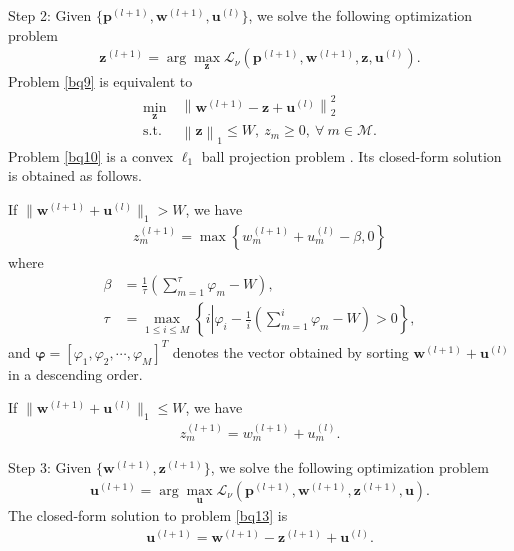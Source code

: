 \documentclass[journal]{IEEEtran}
\begin{document}
Step 2: Given $\{\mathbf{p}^{(l+1)}, \mathbf{w}^{(l+1)}, \mathbf{u}^{(l)}\}$, we solve the following optimization problem
\begin{align}\label{bq9}
\mathbf{z}^{(l+1)}=\arg\max_{\mathbf{z}} \mathcal{L}_\nu\left(\mathbf{p}^{(l+1)}, \mathbf{w}^{(l+1)}, \mathbf{z}, \mathbf{u}^{(l)}\right).
\end{align}
Problem \eqref{bq9} is equivalent to
\begin{align}\label{bq10}
\min_{\mathbf{z}}\ & \left\|\mathbf{w}^{(l+1)}-\mathbf{z}+\mathbf{u}^{(l)} \right\|_2^2 \\ \mbox{s.t.} \ & \left\|\mathbf{z} \right\|_1 \leq W,\  z_m\geq 0,\ \forall\ m\in\mathcal{M}.
\end{align}
Problem \eqref{bq10} is a convex $\ell_1$ ball projection problem \cite{JDuchi}. Its closed-form solution is obtained as follows.

If $\|\mathbf{w}^{(l+1)}+\mathbf{u}^{(l)}\|_1 > W$, we have
\begin{align} \label{bq11}
z_m^{(l+1)}= \max\left\{w_m^{(l+1)}+u_m^{(l)}-\beta, 0\right\}
\end{align}
where
\begin{align}
\beta&=\frac{1}{\tau}\left(\sum\limits_{m=1}^{\tau} \varphi_m - W\right),\\
\tau&= \max_{1 \leq i \leq M} \left\{ i \left|\varphi_i - \frac{1}{i}\left(\sum\limits_{m=1}^{i} \varphi_m - W\right) > 0 \right. \right\},
\end{align}
and $\bm{\varphi} = \left[\varphi_1, \varphi_2, \cdots, \varphi_M\right]^T$
denotes the vector obtained by sorting $\mathbf{w}^{(l+1)}+\mathbf{u}^{(l)}$ in a descending order.

If $\|\mathbf{w}^{(l+1)}+\mathbf{u}^{(l)}\|_1 \leq W$, we have
\begin{align}
z_m^{(l+1)}=w_m^{(l+1)}+u_m^{(l)}.
\end{align}

Step 3: Given $\{\mathbf{w}^{(l+1)}, \mathbf{z}^{(l+1)}\}$, we solve the following optimization problem
\begin{align}\label{bq13}
\mathbf{u}^{(l+1)}=\arg\max_{\mathbf{u}} \mathcal{L}_\nu\left(\mathbf{p}^{(l+1)}, \mathbf{w}^{(l+1)}, \mathbf{z}^{(l+1)}, \mathbf{u}\right).
\end{align}
The closed-form solution to problem \eqref{bq13} is
\begin{align} \label{q24}
\mathbf{u}^{(l+1)} =\mathbf{w}^{(l+1)} - \mathbf{z}^{(l+1)} + \mathbf{u}^{(l)}.
\end{align}
\end{document}
